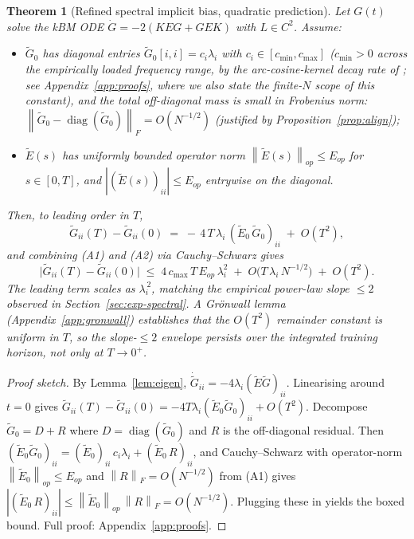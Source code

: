 \documentclass{article}
\newtheorem{theorem}{Theorem}
\DeclareMathOperator{\diag}{diag}
\newcommand{\norm}[1]{\left\|#1\right\|}
\newcommand{\E}{E}
\newcommand{\Gtilde}{\widetilde{G}}
\newcommand{\Etilde}{\widetilde{\E}}
\begin{document}
\begin{theorem}[Refined spectral implicit bias, quadratic prediction]
\label{thm:spectral-refined}
Let $G(t)$ solve the kBM ODE $\dot{G} = -2(K\E G + G\E K)$ with $L \in C^2$.
Assume:
\begin{itemize}
\item[(A1)] $\Gtilde_0$ has diagonal entries
$\Gtilde_0[i,i] = c_i \lambda_i$ with $c_i \in [c_{\min}, c_{\max}]$
($c_{\min}>0$ across the empirically loaded
frequency range, by the
arc-cosine-kernel decay rate of \citet{bach2017breaking}; see
Appendix~\ref{app:proofs}, where we also state the
finite-$N$ scope of this constant),
and the total off-diagonal mass is small in Frobenius norm:
$\norm{\Gtilde_0 - \diag(\Gtilde_0)}_F = O(N^{-1/2})$ (justified by
Proposition~\ref{prop:align});
\item[(A2)] $\Etilde(s)$ has uniformly bounded operator norm
$\norm{\Etilde(s)}_{op} \leq E_{op}$ for $s \in [0, T]$, and
$|(\Etilde(s))_{ii}| \leq E_{op}$ entrywise on the diagonal.
\end{itemize}
Then, to leading order in $T$,
\[
\Gtilde_{ii}(T) - \Gtilde_{ii}(0)
\;=\; -\,4\,T\,\lambda_i\,(\Etilde_0\,\Gtilde_0)_{ii} \;+\; O(T^2),
\]
and combining (A1) and (A2) via Cauchy--Schwarz gives
\[
\boxed{\;
\bigl|\Gtilde_{ii}(T) - \Gtilde_{ii}(0)\bigr|
\;\leq\; 4\,c_{\max}\,T\,E_{op}\,\lambda_i^{2}
\;+\; O\!\bigl(T\,\lambda_i\,N^{-1/2}\bigr)
\;+\; O(T^2).
\;}
\]
The leading term scales as $\lambda_i^{\,2}$, matching the empirical
power-law slope $\leq 2$ observed in Section~\ref{sec:exp-spectral}.
A Gr\"onwall lemma (Appendix~\ref{app:gronwall}) establishes that the
$O(T^2)$ remainder constant is uniform in $T$, so the slope-$\leq 2$
envelope persists over the integrated training horizon, not only at
$T \to 0^+$.
\end{theorem}

\begin{proof}[Proof sketch]
By Lemma~\ref{lem:eigen},
$\dot{\Gtilde}_{ii} = -4\lambda_i(\Etilde\Gtilde)_{ii}$. Linearising around
$t = 0$ gives
$\Gtilde_{ii}(T) - \Gtilde_{ii}(0) = -4 T \lambda_i (\Etilde_0\Gtilde_0)_{ii} + O(T^2)$.
Decompose $\Gtilde_0 = D + R$ where $D = \diag(\Gtilde_0)$ and $R$ is the
off-diagonal residual. Then
$(\Etilde_0\Gtilde_0)_{ii} = (\Etilde_0)_{ii}\,c_i \lambda_i + (\Etilde_0\,R)_{ii}$,
and Cauchy--Schwarz with operator-norm $\norm{\Etilde_0}_{op} \leq E_{op}$
and $\norm{R}_F = O(N^{-1/2})$ from (A1) gives
$|(\Etilde_0\,R)_{ii}| \leq \norm{\Etilde_0}_{op}\,\norm{R}_F = O(N^{-1/2})$.
Plugging these in yields the boxed bound. Full proof:
Appendix~\ref{app:proofs}.
\end{proof}
\end{document}
